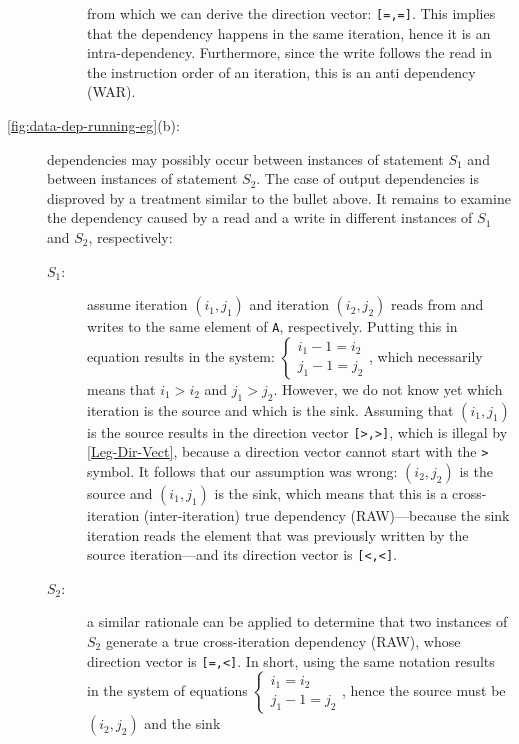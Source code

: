 \documentclass[acmsmall,review]{acmart}\settopmatter{printfolios=true,printccs=false,printacmref=false}
\begin{document}
\begin{description}
\begin{description}
        from which we can derive the direction vector:
        {\tt[=,=]}. This implies that the dependency happens
        in the same iteration, hence it is an intra-dependency.
        Furthermore, since the write follows the read in the
        instruction order of an iteration, this is an anti 
        dependency (WAR).
    \end{description}
    \item[\cref{fig:data-dep-running-eg}(b):] dependencies
        may possibly occur between instances of statement $S_1$
        and between instances of statement $S_2$. The case of
        output dependencies is disproved by a treatment similar
        to the bullet above. It remains to examine the dependency
        caused by a read and a write in different instances of
        $S_1$ and $S_2$, respectively:
    \begin{description}
        \item[$S_1$:] assume iteration $(i_1,j_1)$ and iteration
        $(i_2,j_2)$ reads from and writes to the same element of 
        {\tt A}, respectively. Putting this in equation results in
        the system: $\begin{cases}i_1-1 = i_2\\j_1-1 = j_2\end{cases}$,
        which necessarily means that $i_1 > i_2$ and $j_1 > j_2$.
        However, we do not know yet which iteration is the source
        and which is the sink. Assuming that $(i_1, j_1)$ is the
        source results in the direction vector {\tt[>,>]}, which is
        illegal by \cref{Leg-Dir-Vect}, because a direction
        vector cannot start with the {\tt>} symbol. It follows
        that our assumption was wrong: $(i_2, j_2)$ is the source
        and $(i_1, j_1)$ is the sink, which means that this is
        a cross-iteration (inter-iteration) true dependency
        (RAW)---because the sink iteration reads the element 
        that was previously written by the source iteration---and
        its direction vector is {\tt[<,<]}.
        \item[$S_2$:] a similar rationale can be applied to
        determine that two instances of $S_2$ generate
        a true cross-iteration dependency (RAW), whose
        direction vector is {\tt[=,<]}. In short, using the
        same notation results in the system of equations  
        $\begin{cases}i_1 = i_2\\j_1-1 = j_2\end{cases}$,
        hence the source must be $(i_2,j_2)$ and the sink

\end{description}
\end{description}
\end{document}
